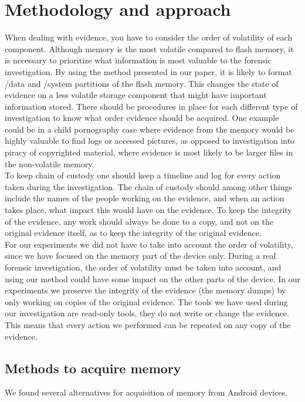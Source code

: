 \section{Methodology and approach}
When dealing with evidence, you have to consider the order of volatility of
each component. Although memory is the most volatile compared to flash memory,
it is necessary to prioritize what information is most valuable to the forensic
investigation. By using the method presented in our paper, it is likely to
format /data and /system partitions of the flash memory. This changes the state
of evidence on a less volatile storage component that might have important
information stored. There should be procedures in place for each different type
of investigation to know what order evidence should be acquired. One example
could be in a child pornography case where evidence from the memory would be
highly valuable to find logs or accessed pictures, as opposed to investigation
into piracy of copyrighted material, where evidence is most likely to be larger
files in the non-volatile memory.\\

To keep chain of custody one should keep a timeline and log for every action
taken during the investigation. The chain of custody should among other things
include the names of the people working on the evidence, and  when an action
takes place, what impact this would have on the evidence. To keep the integrity
of the evidence, any work should always be done to a copy, and not on the
original evidence itself, as to keep the integrity of the original evidence.\\

For our experiments we did not have to take into account the order of
volatility, since we have focused on the memory part of the device only. During
a real forensic investigation, the order of volatility must be taken into
account, and using our method could have some impact on the other parts of the
device. In our experiments we preserve the integrity of the evidence (the
memory dumps) by only working on copies of the original evidence. The tools we
have used during our investigation are read-only tools, they do not write or
change the evidence. This means that every action we performed can be repeated
on any copy of the evidence.

\subsection{Methods to acquire memory}
We found several alternatives for acquisition of memory from Android devices.
